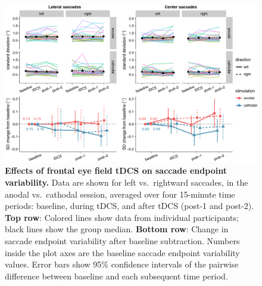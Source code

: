 \documentclass[11pt,]{memoir}
\begin{document}
\begin{figure}
\includegraphics[width=130mm]{sacc_tDCS_files/figures/figure_7_variability} \caption{\textbf{Effects of frontal eye field tDCS on saccade endpoint variability.} Data are shown for left vs.~rightward saccades, in the anodal vs.~cathodal session, averaged over four 15-minute time periods: baseline, during tDCS, and after tDCS (post-1 and post-2). \textbf{Top row}: Colored lines show data from individual participants; black lines show the group median. \textbf{Bottom row}: Change in saccade endpoint variability after baseline subtraction. Numbers inside the plot axes are the baseline saccade endpoint variability values. Error bars show 95\% confidence intervals of the pairwise difference between baseline and each subsequent time period.}\label{fig:fig-variability}
\end{figure}



\begingroup
\setlength{\LTleft}{-20cm plus -1fill}
\setlength{\LTright}{\LTleft}
\small
\end{document}
